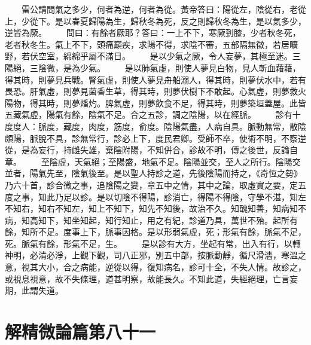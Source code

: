 　　雷公請問氣之多少，何者為逆，何者為從。黃帝答曰：陽從左，陰從右，老從上，少從下。是以春夏歸陽為生，歸秋冬為死，反之則歸秋冬為生，是以氣多少，逆皆為厥。
　　問曰：有餘者厥耶？答曰：一上不下，寒厥到膝，少者秋冬死，老者秋冬生。氣上不下，頭痛巔疾，求陽不得，求陰不審，五部隔無徵，若居曠野，若伏空室，綿綿乎屬不滿日。
　　是以少氣之厥，令人妄夢，其極至迷。三陽絕，三陰微，是為少氣。
　　是以肺氣虛，則使人夢見白物，見人斬血藉藉，得其時，則夢見兵戰。腎氣虛，則使人夢見舟船溺人，得其時，則夢伏水中，若有畏恐。肝氣虛，則夢見菌香生草，得其時，則夢伏樹下不敢起。心氣虛，則夢救火陽物，得其時，則夢燔灼。脾氣虛，則夢飲食不足，得其時，則夢築垣蓋屋。此皆五藏氣虛，陽氣有餘，陰氣不足。合之五診，調之陰陽，以在經脈。
　　診有十度度人：脈度，藏度，肉度，筋度，俞度。陰陽氣盡，人病自具。脈動無常，散陰頗陽，脈脫不具，診無常行，診必上下，度民君卿。受師不卒，使術不明，不察逆從，是為妄行，持雌失雄，棄陰附陽，不知併合，診故不明，傳之後世，反論自章。
　　至陰虛，天氣絕；至陽盛，地氣不足。陰陽並交，至人之所行。陰陽交並者，陽氣先至，陰氣後至。是以聖人持診之道，先後陰陽而持之，《奇恆之勢》乃六十首，診合微之事，追陰陽之變，章五中之情，其中之論，取虛實之要，定五度之事，知此乃足以診。是以切陰不得陽，診消亡，得陽不得陰，守學不湛，知左不知右，知右不知左，知上不知下，知先不知後，故治不久。知醜知善，知病知不病，知高知下，知坐知起，知行知止，用之有紀，診道乃具，萬世不殆。起所有餘，知所不足。度事上下，脈事因格。是以形弱氣虛，死；形氣有餘，脈氣不足，死。脈氣有餘，形氣不足，生。
　　是以診有大方，坐起有常，出入有行，以轉神明，必清必淨，上觀下觀，司八正邪，別五中部，按脈動靜，循尺滑濇，寒溫之意，視其大小，合之病能，逆從以得，復知病名，診可十全，不失人情。故診之，或視息視意，故不失條理，道甚明察，故能長久。不知此道，失經絕理，亡言妄期，此謂失道。

\section{解精微論篇第八十一}

